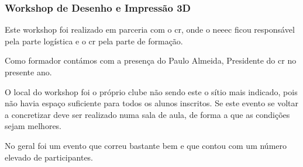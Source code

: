 
\subsubsection{Workshop de Desenho e Impressão 3D}

Este workshop foi realizado em parceria com o \acrfull{cr}, onde o \acrshort{neeec} ficou responsável pela parte logística e o \acrshort{cr} pela parte de formação.

Como formador contámos com a presença do Paulo Almeida, Presidente do \acrshort{cr} no presente ano.

O local do workshop foi o próprio clube não sendo este o sítio mais indicado, pois não havia espaço suficiente para todos os alunos inscritos. Se este evento se voltar a concretizar deve ser realizado numa sala de aula, de forma a que as condições sejam melhores. 

No geral foi um evento que correu bastante bem e que contou com um número elevado de participantes.